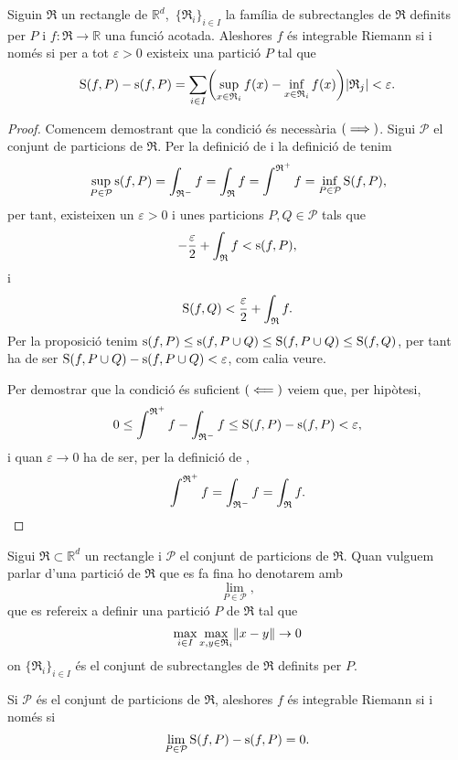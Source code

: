 \documentclass[../Apunts.tex]{subfiles}
\begin{document}
	\begin{theorem}
		\label{thm:Criteri d'integrabilitat Riemann}
		Siguin \(\mathfrak{R}\) un rectangle de \(\mathbb{R}^{d}\),\ \(\{\mathfrak{R}_{i}\}_{i\in I}\) la família de subrectangles de \(\mathfrak{R}\) definits per \(P\) i \(f\colon\mathfrak{R}\to\mathbb{R}\) una funció acotada. Aleshores \(f\) és integrable Riemann si i només si per a tot \(\varepsilon>0\) existeix una partició \(P\) tal que
		\[\Ssup(f,P)-\sinf(f,P)=\sum_{i\in I}\left(\sup_{x\in \mathfrak{R}_{i}}f(x)-\inf_{x\in \mathfrak{R}_{i}}f(x)\right)\abs{\mathfrak{R}_{j}}<\varepsilon.\]
		\begin{proof}
			Comencem demostrant que la condició és necessària \((\implies)\). Sigui \(\mathcal{P}\) el conjunt de particions de \(\mathfrak{R}\). Per la definició de  i la definició de  tenim
			\[\sup_{P\in\mathcal{P}}\operatorname{s}(f,P)=\int_{\mathfrak{R}^{-}}f=\int_{\mathfrak{R}}f=\int^{\mathfrak{R}^{+}}f=\inf_{P\in\mathcal{P}}\operatorname{S}(f,P),\]
			per tant, existeixen un \(\varepsilon>0\) i unes particions \(P,Q\in\mathcal{P}\) tals que
			\[-\frac{\varepsilon}{2}+\int_{\mathfrak{R}}f<\operatorname{s}(f,P),\]
			i
			\[\operatorname{S}(f,Q)<\frac{\varepsilon}{2}+\int_{\mathfrak{R}}f.\]
			Per la proposició  tenim \(\operatorname{s}(f,P)\leq\operatorname{s}(f,P\cup Q)\leq\operatorname{S}(f,P\cup Q)\leq\operatorname{S}(f,Q)\), per tant ha de ser \(\operatorname{S}(f,P\cup Q)-\operatorname{s}(f,P\cup Q)<\varepsilon\), com calia veure.
			
			Per demostrar que la condició és suficient \((\impliedby)\) veiem que, per hipòtesi,
			\[0\leq\int^{\mathfrak{R}^{+}}f-\int_{\mathfrak{R}^{-}}f\leq\operatorname{S}(f,P)-\operatorname{s}(f,P)<\varepsilon,\]
			i quan \(\varepsilon\to0\) ha de ser, per la definició de ,
			\[\int^{\mathfrak{R}^{+}}f=\int_{\mathfrak{R}^{-}}f=\int_{\mathfrak{R}}f.\qedhere\]
		\end{proof}
		\begin{notation}
			Sigui \(\mathfrak{R}\subset\mathbb{R}^{d}\) un rectangle i \(\mathcal{P}\) el conjunt de particions de \(\mathfrak{R}\).
			Quan vulguem parlar d'una partició de \(\mathfrak{R}\) que es fa fina ho denotarem amb
			\[\lim_{P\in\mathcal{P}},\]
			que es refereix a definir una partició \(P\) de \(\mathfrak{R}\) tal que
			\[\max_{i\in I}\max_{x,y\in \mathfrak{R}_{i}}\norm{x-y}\to0\]
			on \(\{\mathfrak{R}_{i}\}_{i\in I}\) és el conjunt de subrectangles de \(\mathfrak{R}\) definits per \(P\).
		\end{notation}
		\begin{corollary}\label{corollary:Sumes superior i inferior iguals integrable Riemann}
			Si \(\mathcal{P}\) és el conjunt de particions de \(\mathfrak{R}\), aleshores \(f\) és integrable Riemann si i només si
			\[\lim_{P\in\mathcal{P}}\operatorname{S}(f,P)-\operatorname{s}(f,P)=0.\]%
		\end{corollary}
	\end{theorem}
\end{document}

